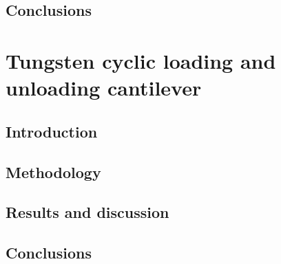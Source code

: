 \subsection{Conclusions}

\section{Tungsten cyclic loading and unloading cantilever}\label{s:tungstenCyclic}
\subsection{Introduction}
\subsection{Methodology}
\subsection{Results and discussion}
\subsection{Conclusions}



